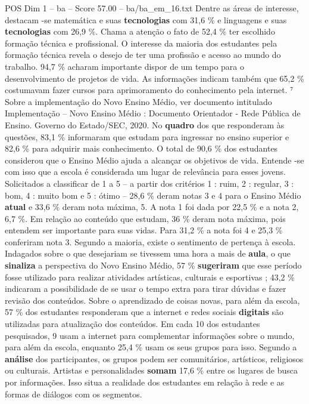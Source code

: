 \begin{textsample}{POS Dim 1 – ba – Score 57.00 – ba/ba\_em\_16.txt}
Dentre as áreas de interesse, destacam -se matemática e suas \textbf{tecnologias} com 31,6 \% e linguagens e suas \textbf{tecnologias} com 26,9 \%.
Chama a atenção o fato de 52,4 \% ter escolhido formação técnica e profissional.
O interesse da maioria dos estudantes pela formação técnica revela o desejo de ter uma profissão e acesso ao mundo do trabalho. 94,7 \% acharam importante dispor de um tempo para o desenvolvimento de projetos de vida.
As informações indicam também que 65,2 \% costumavam fazer cursos para aprimoramento do conhecimento pela internet. ⁷ Sobre a implementação do Novo Ensino Médio, ver documento intitulado Implementação – Novo Ensino Médio : Documento Orientador - Rede Pública de Ensino.
Governo do Estado/SEC, 2020.
No \textbf{quadro} dos que responderam às questões, 83,1 \% informaram que estudam para ingressar no ensino superior e 82,6 \% para adquirir mais conhecimento.
O total de 90,6 \% dos estudantes considerou que o Ensino Médio ajuda a alcançar os objetivos de vida.
Entende -se com isso que a escola é considerada um lugar de relevância para esses jovens.
Solicitados a classificar de 1 a 5 – a partir dos critérios 1 : ruim, 2 : regular, 3 : bom, 4 : muito bom e 5 : ótimo – 28,6 \% deram notas 3 e 4 para o Ensino Médio \textbf{atual} e 33,6 \% deram nota máxima, 5.
A nota 1 foi dada por 22,5 \% e a nota 2, 6,7 \%.
Em relação ao conteúdo que estudam, 36 \% deram nota máxima, pois entendem ser importante para suas vidas.
Para 31,2 \% a nota foi 4 e 25,3 \% conferiram nota 3.
Segundo a maioria, existe o sentimento de pertença à escola.
Indagados sobre o que desejariam se tivessem uma hora a mais de \textbf{aula}, o que \textbf{sinaliza} a perspectiva do Novo Ensino Médio, 57 \% \textbf{sugeriram} que esse período fosse utilizado para realizar atividades artísticas, culturais e esportivas ; 43,2 \% indicaram a possibilidade de se usar o tempo extra para tirar dúvidas e fazer revisão dos conteúdos.
Sobre o aprendizado de coisas novas, para além da escola, 57 \% dos estudantes responderam que a internet e redes sociais \textbf{digitais} são utilizadas para atualização dos conteúdos.
Em cada 10 dos estudantes pesquisados, 9 usam a internet para complementar informações sobre o mundo, para além da escola, enquanto 25,4 \% usam os seus grupos para isso.
Segundo a \textbf{análise} dos participantes, os grupos podem ser comunitários, artísticos, religiosos ou culturais.
Artistas e personalidades \textbf{somam} 17,6 \% entre os lugares de busca por informações.
Isso situa a realidade dos estudantes em relação à rede e as formas de diálogos com os segmentos.

\end{textsample}
